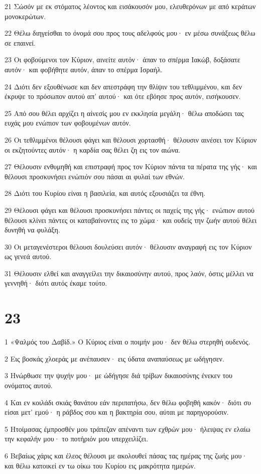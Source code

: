 \par 21 Σώσόν με εκ στόματος λέοντος και εισάκουσόν μου, ελευθερόνων με από κεράτων μονοκερώτων.
\par 22 Θέλω διηγείσθαι το όνομά σου προς τους αδελφούς μου· εν μέσω συνάξεως θέλω σε επαινεί.
\par 23 Οι φοβούμενοι τον Κύριον, αινείτε αυτόν· άπαν το σπέρμα Ιακώβ, δοξάσατε αυτόν· και φοβήθητε αυτόν, άπαν το σπέρμα Ισραήλ.
\par 24 Διότι δεν εξουθένωσε και δεν απεστράφη την θλίψιν του τεθλιμμένου, και δεν έκρυψε το πρόσωπον αυτού απ' αυτού· και ότε εβόησε προς αυτόν, εισήκουσεν.
\par 25 Από σου θέλει αρχίζει η αίνεσίς μου εν εκκλησία μεγάλη· θέλω αποδώσει τας ευχάς μου ενώπιον των φοβουμένων αυτόν.
\par 26 Οι τεθλιμμένοι θέλουσι φάγει και θέλουσι χορτασθή· θέλουσιν αινέσει τον Κύριον οι εκζητούντες αυτόν· η καρδία σας θέλει ζη εις τον αιώνα.
\par 27 Θέλουσιν ενθυμηθή και επιστραφή προς τον Κύριον πάντα τα πέρατα της γής· και θέλουσι προσκυνήσει ενώπιόν σου πάσαι αι φυλαί των εθνών.
\par 28 Διότι του Κυρίου είναι η βασιλεία, και αυτός εξουσιάζει τα έθνη.
\par 29 Θέλουσι φάγει και θέλουσι προσκυνήσει πάντες οι παχείς της γής· ενώπιον αυτού θέλουσι κλίνει πάντες οι καταβαίνοντες εις το χώμα· και ουδείς την ζωήν αυτού θέλει δυνηθή να φυλάξη.
\par 30 Οι μεταγενέστεροι θέλουσι δουλεύσει αυτόν· θέλουσιν αναγραφή εις τον Κύριον ως γενεά αυτού.
\par 31 Θέλουσιν ελθεί και αναγγείλει την δικαιοσύνην αυτού, προς λαόν, όστις μέλλει να γεννηθή· διότι αυτός έκαμε τούτο.

\chapter{23}

\par 1 «Ψαλμός του Δαβίδ.» Ο Κύριος είναι ο ποιμήν μου· δεν θέλω στερηθή ουδενός.
\par 2 Εις βοσκάς χλοεράς με ανέπαυσεν· εις ύδατα αναπαύσεως με ωδήγησεν.
\par 3 Ηνώρθωσε την ψυχήν μου· με ώδήγησε διά τρίβων δικαιοσύνης ένεκεν του ονόματος αυτού.
\par 4 Και εν κοιλάδι σκιάς θανάτου εάν περιπατήσω, δεν θέλω φοβηθή κακόν· διότι συ είσαι μετ' εμού· η ράβδος σου και η βακτηρία σου, αύται με παρηγορούσιν.
\par 5 Ητοίμασας έμπροσθέν μου τράπεζαν απέναντι των εχθρών μου· ήλειψας εν ελαίω την κεφαλήν μου· το ποτήριόν μου υπερχειλίζει.
\par 6 Βεβαίως χάρις και έλεος θέλουσι με ακολουθεί πάσας τας ημέρας της ζωής μου· και θέλω κατοικεί εν τω οίκω του Κυρίου εις μακρότητα ημερών.

